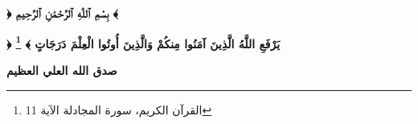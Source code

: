 \renewcommand{\thefootnote}{\fnsymbol{footnote}}

\chapter*{}

\vfill
\begin{center}
	\Large
	\amirifont \textbf{﴿ بِسْمِ ٱللّٰهِ ٱلرَّحْمَٰنِ ٱلرَّحِيمِ ﴾}
\end{center}
{\amirifont	\begin{center}\bfseries\Large
		﴿ يَرْفَعِ اللَّهُ الَّذِينَ آمَنُوا مِنكُمْ وَالَّذِينَ أُوتُوا الْعِلْمَ دَرَجَاتٍ ﴾
		\footnote{القرآن الكريم، سورة المجادلة الآية 11}
	\end{center}
	\hfill \textbf{صدق الله العلي العظيم}
}
\vfill